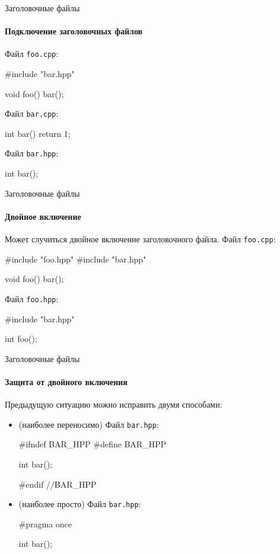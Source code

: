 \documentclass[9pt]{beamer}
\begin{document}
\begin{frame}[fragile]{Заголовочные файлы}
    \framesubtitle{Подключение заголовочных файлов}
    Файл \texttt{foo.cpp}:
    \begin{cppcode}
        #include "bar.hpp"
        
        void foo()
        {
            bar();        
        }
    \end{cppcode}
    
    \vspace{2em}
    Файл \texttt{bar.cpp}:
    \begin{cppcode}
        int bar(){ return 1; }
    \end{cppcode}

    \vspace{2em}
    Файл \texttt{bar.hpp}:
    \begin{cppcode}
        int bar();
    \end{cppcode}    
\end{frame}


\begin{frame}[fragile]{Заголовочные файлы}
    \framesubtitle{Двойное включение}
    Может случиться двойное включение заголовочного файла.
    Файл \texttt{foo.cpp}:
    \begin{cppcode}
        #include "foo.hpp"
        #include "bar.hpp"
        
        void foo()
        {
            bar();        
        }
    \end{cppcode}
    
    \vspace{2em}
    Файл \texttt{foo.hpp}:
    \begin{cppcode}
        #include "bar.hpp"
        
        int foo();
    \end{cppcode}  
\end{frame}


\begin{frame}[fragile]{Заголовочные файлы}
    \framesubtitle{Защита от двойного включения}
    Предыдущую ситуацию можно исправить двумя способами:
    \begin{itemize}
    \item (наиболее переносимо) Файл \texttt{bar.hpp}:
    \begin{cppcode}
        #ifndef BAR_HPP
        #define BAR_HPP
        
        int bar();
        
        #endif //BAR_HPP
    \end{cppcode}

    \item (наиболее просто) Файл \texttt{bar.hpp}:
    \begin{cppcode}
        #pragma once
        
        int bar();
    \end{cppcode}  
    \end{itemize}
    
\end{frame}
\end{document}

